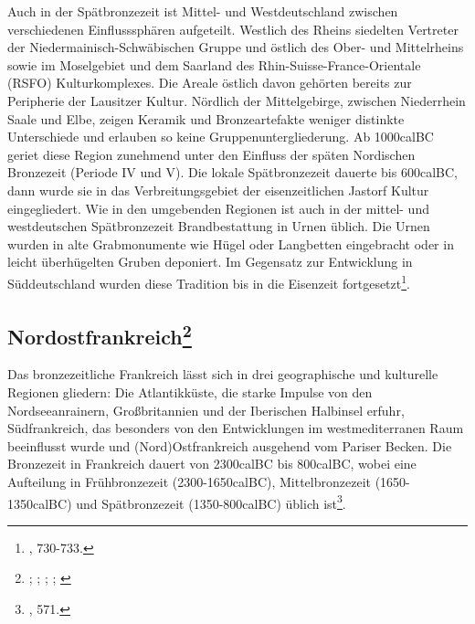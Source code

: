 \documentclass[openany,twoside,twocolumn]{book}
\let\rmarkdownfootnote\footnote%
\def\footnote{\protect\rmarkdownfootnote}
\begin{document}
Auch in der Spätbronzezeit ist Mittel- und Westdeutschland zwischen verschiedenen Einflusssphären aufgeteilt. Westlich des Rheins siedelten Vertreter der Niedermainisch-Schwäbischen Gruppe und östlich des Ober- und Mittelrheins sowie im Moselgebiet und dem Saarland des Rhin-Suisse-France-Orientale (RSFO) Kulturkomplexes. Die Areale östlich davon gehörten bereits zur Peripherie der Lausitzer Kultur. Nördlich der Mittelgebirge, zwischen Niederrhein Saale und Elbe, zeigen Keramik und Bronzeartefakte weniger distinkte Unterschiede und erlauben so keine Gruppenuntergliederung. Ab 1000calBC geriet diese Region zunehmend unter den Einfluss der späten Nordischen Bronzezeit (Periode IV und V). Die lokale Spätbronzezeit dauerte bis 600calBC, dann wurde sie in das Verbreitungsgebiet der eisenzeitlichen Jastorf Kultur eingegliedert. Wie in den umgebenden Regionen ist auch in der mittel- und westdeutschen Spätbronzezeit Brandbestattung in Urnen üblich. Die Urnen wurden in alte Grabmonumente wie Hügel oder Langbetten eingebracht oder in leicht überhügelten Gruben deponiert. Im Gegensatz zur Entwicklung in Süddeutschland wurden diese Tradition bis in die Eisenzeit fortgesetzt\footnote{\textcite{jockenhovel_germany_2013}, 730-733.}.

\hypertarget{nordostfrankreich}{%
\subsection[Nordostfrankreich]{\texorpdfstring{Nordostfrankreich\footnote{\textcite{bourgeois_lage_2005-1}; \textcite{briard_groupe_1988}; \textcite{gomez_bronze_1995}; \textcite{mordant_bronze_2013}; \textcite{mordant_les_2005}}}{Nordostfrankreich}}\label{nordostfrankreich}}

Das bronzezeitliche Frankreich lässt sich in drei geographische und kulturelle Regionen gliedern: Die Atlantikküste, die starke Impulse von den Nordseeanrainern, Großbritannien und der Iberischen Halbinsel erfuhr, Südfrankreich, das besonders von den Entwicklungen im westmediterranen Raum beeinflusst wurde und (Nord)Ostfrankreich ausgehend vom Pariser Becken. Die Bronzezeit in Frankreich dauert von 2300calBC bis 800calBC, wobei eine Aufteilung in Frühbronzezeit (2300-1650calBC), Mittelbronzezeit (1650-1350calBC) und Spätbronzezeit (1350-800calBC) üblich ist\footnote{\textcite{mordant_bronze_2013}, 571.}.
\end{document}
